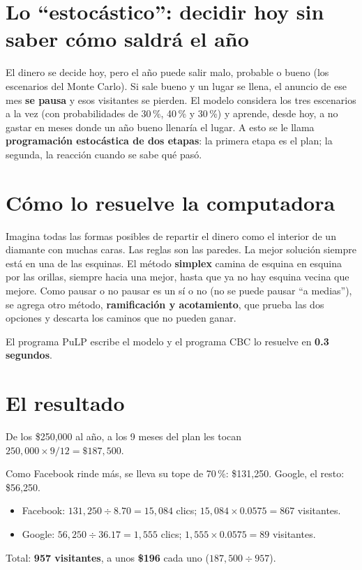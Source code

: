 \section{Lo ``estocástico'': decidir hoy sin saber cómo saldrá el año}
El dinero se decide hoy, pero el año puede salir malo, probable o bueno (los escenarios del Monte Carlo). Si sale bueno y
un lugar se llena, el anuncio de ese mes \textbf{se pausa} y esos visitantes se pierden. El modelo considera los tres
escenarios a la vez (con probabilidades de 30\,\%, 40\,\% y 30\,\%) y aprende, desde hoy, a no gastar en meses donde un año
bueno llenaría el lugar. A esto se le llama \textbf{programación estocástica de dos etapas}: la primera etapa es el plan;
la segunda, la reacción cuando se sabe qué pasó.

\section{Cómo lo resuelve la computadora}
\begin{intuicion}
Imagina todas las formas posibles de repartir el dinero como el interior de un diamante con muchas caras. Las reglas son
las paredes. La mejor solución siempre está en una de las esquinas. El método \textbf{simplex} camina de esquina en esquina
por las orillas, siempre hacia una mejor, hasta que ya no hay esquina vecina que mejore. Como pausar o no pausar es un sí o
no (no se puede pausar ``a medias''), se agrega otro método, \textbf{ramificación y acotamiento}, que prueba las dos
opciones y descarta los caminos que no pueden ganar.
\end{intuicion}
El programa PuLP escribe el modelo y el programa CBC lo resuelve en \textbf{0.3 segundos}.

\section{El resultado}
\begin{ejemplo}
De los \$250,000 al año, a los 9 meses del plan les tocan $250{,}000\times9/12=\$187{,}500$.

Como Facebook rinde más, se lleva su tope de 70\,\%: \$131,250. Google, el resto: \$56,250.
\begin{itemize}
\item Facebook: $131{,}250\div8.70=15{,}084$ clics; $15{,}084\times0.0575=867$ visitantes.
\item Google: $56{,}250\div36.17=1{,}555$ clics; $1{,}555\times0.0575=89$ visitantes.
\end{itemize}
Total: \textbf{957 visitantes}, a unos \textbf{\$196} cada uno ($187{,}500\div957$).
\end{ejemplo}

